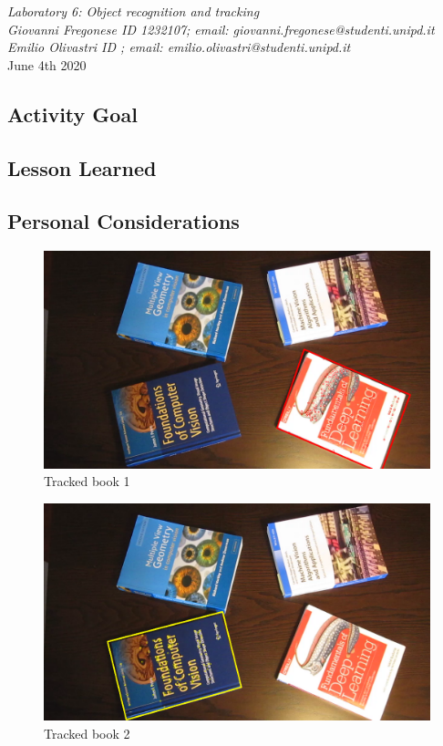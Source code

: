 \documentclass[a4paper,11pt]{article}
\makeatletter
\newcommand{\expT}{Object recognition and tracking}
\newcommand{\cand}{Giovanni Fregonese ID 1232107; email: giovanni.fregonese@studenti.unipd.it \\
                   Emilio Olivastri ID ; email: emilio.olivastri@studenti.unipd.it}
\newcommand{\dateD}{June 4th 2020}
\makeatother
\begin{document}
\begin{center}
	\Large
	\begin{center}
		\textsl{Laboratory 6: \expT}\\
		\large
		\hfill\break
		\textsl{\cand}\\
		\dateD
	\end{center}
\end{center}

\subsection*{Activity Goal}



\subsection*{Lesson Learned}



\subsection*{Personal Considerations}


\begin{figure}[h]
    \centering
    \includegraphics[width=\textwidth]{imgs/TrackedFeatures0.png}
    \caption{Tracked book 1}
    \label{fig:book1}
\end{figure}

\begin{figure}[h]
    \centering
    \includegraphics[width=\textwidth]{imgs/TrackedFeatures1.png}
    \caption{Tracked book 2}
    \label{fig:book2}
\end{figure}
\end{document}
